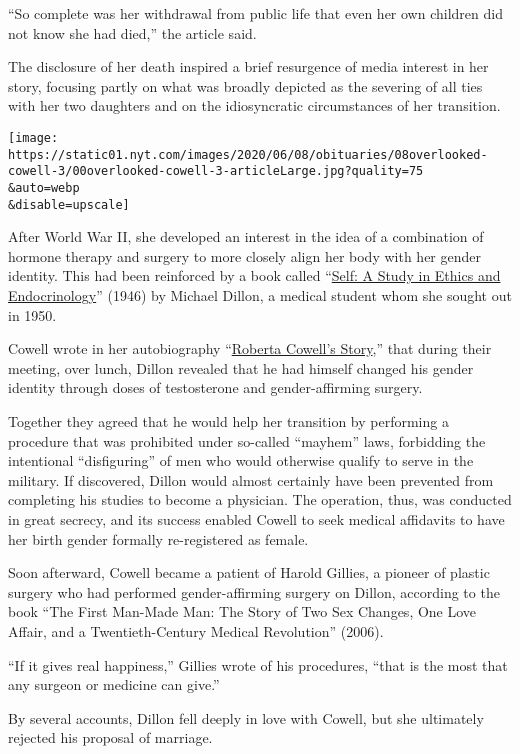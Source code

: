 ``So complete was her withdrawal from public life that even her own
children did not know she had died,'' the article said.

The disclosure of her death inspired a brief resurgence of media
interest in her story, focusing partly on what was broadly depicted as
the severing of all ties with her two daughters and on the idiosyncratic
circumstances of her transition.

\texttt{[image: https://static01.nyt.com/images/2020/06/08/obituaries/08overlooked-cowell-3/00overlooked-cowell-3-articleLarge.jpg?quality=75\\\&auto=webp\\\&disable=upscale]}

After World War II, she developed an interest in the idea of a
combination of hormone therapy and surgery to more closely align her
body with her gender identity. This had been reinforced by a book called
``\href{https://books.google.com/books/about/Self.html?id=-oVtNAAACAAJ}{Self:
A Study in Ethics and Endocrinology}'' (1946) by Michael Dillon, a
medical student whom she sought out in 1950.

Cowell wrote in her autobiography
``\href{http://library.transgenderzone.com/?page_id=3058}{Roberta
Cowell's Story},'' that during their meeting, over lunch, Dillon
revealed that he had himself changed his gender identity through doses
of testosterone and gender-affirming surgery.

Together they agreed that he would help her transition by performing a
procedure that was prohibited under so-called ``mayhem'' laws,
forbidding the intentional ``disfiguring'' of men who would otherwise
qualify to serve in the military. If discovered, Dillon would almost
certainly have been prevented from completing his studies to become a
physician. The operation, thus, was conducted in great secrecy, and its
success enabled Cowell to seek medical affidavits to have her birth
gender formally re-registered as female.

Soon afterward, Cowell became a patient of Harold Gillies, a pioneer of
plastic surgery who had performed gender-affirming surgery on Dillon,
according to the book ``The First Man-Made Man: The Story of Two Sex
Changes, One Love Affair, and a Twentieth-Century Medical Revolution''
(2006).

``If it gives real happiness,'' Gillies wrote of his procedures, ``that
is the most that any surgeon or medicine can give.''

By several accounts, Dillon fell deeply in love with Cowell, but she
ultimately rejected his proposal of marriage.

